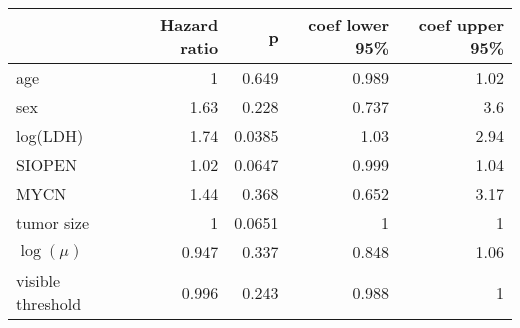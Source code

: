 \begin{tabular}{lrrrr}
\toprule
{} &  Hazard ratio &      p &  coef lower 95\% &  coef upper 95\% \\
\midrule
age               &             1 &  0.649 &            0.989 &             1.02 \\
sex               &          1.63 &  0.228 &            0.737 &              3.6 \\
log(LDH)          &          1.74 & 0.0385 &             1.03 &             2.94 \\
SIOPEN            &          1.02 & 0.0647 &            0.999 &             1.04 \\
MYCN              &          1.44 &  0.368 &            0.652 &             3.17 \\
tumor size        &             1 & 0.0651 &                1 &                1 \\
$\log(\mu)$       &         0.947 &  0.337 &            0.848 &             1.06 \\
visible threshold &         0.996 &  0.243 &            0.988 &                1 \\
\bottomrule
\end{tabular}
